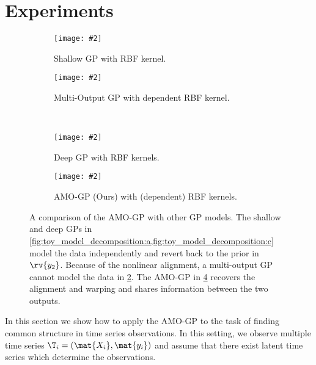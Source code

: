 \documentclass{article}
\newcommand{\includestandalonewithpath}[2][]{%
    \texttt{[image: \#2]}
}
\begin{document}
\section{Experiments}
\label{sec:experiments}
\begin{figure}[t]
    \centering
    \begin{subfigure}{.475\linewidth}
        \centering
        \includestandalonewithpath{figures/toy_decomposition_shallow_gp}
        \caption{
            Shallow GP with RBF kernel.
            \label{fig:toy_model_decomposition:a}
        }
    \end{subfigure}
    \hfill
    \begin{subfigure}{.475\linewidth}
        \centering
        \includestandalonewithpath{figures/toy_decomposition_mo_gp}
        \caption{
            Multi-Output GP with dependent RBF kernel.
            \label{fig:toy_model_decomposition:b}
        }
    \end{subfigure}
    \\[\baselineskip]
    \begin{subfigure}{.475\linewidth}
        \centering
        \includestandalonewithpath{figures/toy_decomposition_dgp}
        \caption{
            Deep GP with RBF kernels.
            \label{fig:toy_model_decomposition:c}
        }
    \end{subfigure}
    \hfill
    \begin{subfigure}{.475\linewidth}
        \centering
        \includestandalonewithpath{figures/toy_decomposition_ours}
        \caption{
            AMO-GP (Ours) with (dependent) RBF kernels.
            \label{fig:toy_model_decomposition:d}
        }
    \end{subfigure}
    \caption{
        \label{fig:toy_model_decomposition}
        A comparison of the AMO-GP with other GP models.
        The shallow and deep GPs in \cref{fig:toy_model_decomposition:a,fig:toy_model_decomposition:c} model the data independently and revert back to the prior in $\rv{y_2}$.
        Because of the nonlinear alignment, a multi-output GP cannot model the data in \cref{fig:toy_model_decomposition:b}.
        The AMO-GP in \cref{fig:toy_model_decomposition:d} recovers the alignment and warping and shares information between the two outputs.
    }
\end{figure}
In this section we show how to apply the AMO-GP to the task of finding common structure in time series observations.
In this setting, we observe multiple time series $\T_i = (\mat{X_i}, \mat{y_i})$ and assume that there exist latent time series which determine the observations.
\end{document}
